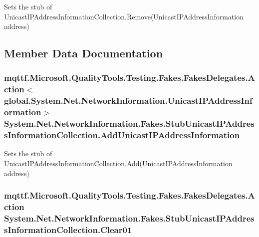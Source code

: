 Sets the stub of Unicast\-I\-P\-Address\-Information\-Collection.\-Remove(\-Unicast\-I\-P\-Address\-Information address)



\subsection{Member Data Documentation}
\hypertarget{class_system_1_1_net_1_1_network_information_1_1_fakes_1_1_stub_unicast_i_p_address_information_collection_a46f682548ae7cc408ef21622300bba28}{
\subsubsection[{Add\-Unicast\-I\-P\-Address\-Information}]{\setlength{\rightskip}{0pt plus 5cm}mqttf.\-Microsoft.\-Quality\-Tools.\-Testing.\-Fakes.\-Fakes\-Delegates.\-Action$<$global.\-System.\-Net.\-Network\-Information.\-Unicast\-I\-P\-Address\-Information$>$ System.\-Net.\-Network\-Information.\-Fakes.\-Stub\-Unicast\-I\-P\-Address\-Information\-Collection.\-Add\-Unicast\-I\-P\-Address\-Information}}\label{class_system_1_1_net_1_1_network_information_1_1_fakes_1_1_stub_unicast_i_p_address_information_collection_a46f682548ae7cc408ef21622300bba28}


Sets the stub of Unicast\-I\-P\-Address\-Information\-Collection.\-Add(\-Unicast\-I\-P\-Address\-Information address)

\hypertarget{class_system_1_1_net_1_1_network_information_1_1_fakes_1_1_stub_unicast_i_p_address_information_collection_ae5db87d0d68eeb31ae278c9dd9c5a9aa}{
\subsubsection[{Clear01}]{\setlength{\rightskip}{0pt plus 5cm}mqttf.\-Microsoft.\-Quality\-Tools.\-Testing.\-Fakes.\-Fakes\-Delegates.\-Action System.\-Net.\-Network\-Information.\-Fakes.\-Stub\-Unicast\-I\-P\-Address\-Information\-Collection.\-Clear01}}\label{class_system_1_1_net_1_1_network_information_1_1_fakes_1_1_stub_unicast_i_p_address_information_collection_ae5db87d0d68eeb31ae278c9dd9c5a9aa}


